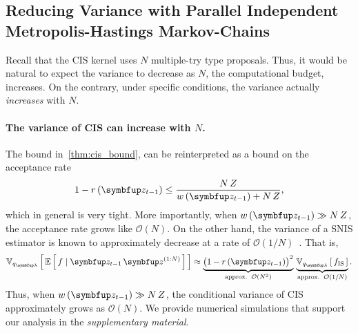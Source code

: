 

\subsection{Reducing Variance with Parallel Independent Metropolis-Hastings Markov-Chains}\label{section:cis_bias}
Recall that the CIS kernel uses \(N\) multiple-try type proposals.
Thus, it would be natural to expect the variance to decrease as \(N\), the computational budget, increases.
On the contrary, under specific conditions, the variance actually \textit{increases} with \(N\).

\vspace{-0.1in}
\paragraph{The variance of CIS can increase with \(N\).}
The bound in~\cref{thm:cis_bound}, can be reinterpreted as a bound on the acceptance rate 
\begin{align}
  1 - r\,(\vz_{t-1}) \leq \frac{N\,Z}{ w\,(\vz_{t-1}) + N\,Z},
\end{align}
which in general is very tight.
More importantly, when \(w\,(\vz_{t-1}) \gg N\,Z\), the acceptance rate grows like \(\mathcal{O}(N)\).
On the other hand, the variance of a SNIS estimator is known to approximately decrease at a rate of \(\mathcal{O}(1/N)\)~\citep{kong_sequential_1994, robert_monte_2004, elvira_rethinking_2018}.
That is, 
\begin{align}
  \Vsub{q_{\vlambda}}{ \E{ f \mid \vz_{t-1}\,\vz^{(1:N)} } } \approx \underbrace{{\big(1 - r\,(\vz_{t-1})\big)}^2}_{\text{approx.}\;\;\mathcal{O}(N^2)} \,
  \underbrace{\Vsub{q_{\vlambda}}{ f_{\text{IS}} }}_{\text{approx.}\;\;\mathcal{O}(1/N)}.\label{eq:cis_variance_incr}
\end{align}
Thus, when \(w\,(\vz_{t-1})\gg N\,Z\), the conditional variance of CIS approximately grows as \(\mathcal{O}(N)\).
We provide numerical simulations that support our analysis in the \textit{supplementary material}.

